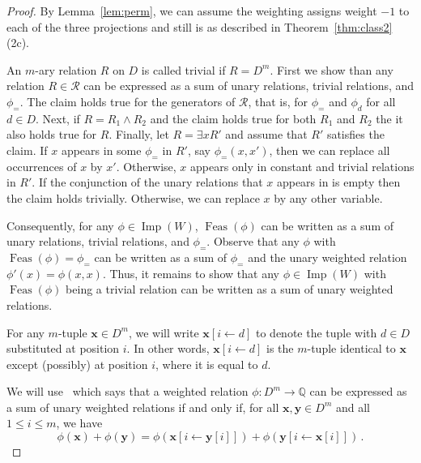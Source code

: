 \documentclass[11pt, reqno]{article}
\newcommand{\tup}[1]{\ensuremath{\mathbf #1}}
\DeclareMathOperator{\feas}{Feas}
\DeclareMathOperator{\imp}{Imp}
\newcommand{\Q}{\mbox{$\mathbb Q$}}
\theoremstyle{remark}
\begin{document}
\begin{proof}
By Lemma~\ref{lem:perm}, we can assume the weighting assigns weight $-1$ to each
of the three projections and still is as described in
Theorem~\ref{thm:class2}\,(2c).

An $m$-ary relation $R$ on $D$ is called trivial if $R=D^m$. First we show than
any relation $R\in\mathcal{R}$ can be expressed as a sum of unary relations,
trivial relations, and $\phi_=$. The claim holds true for the generators of
$\mathcal{R}$, that is, for $\phi_=$ and $\phi_d$ for all $d\in D$. Next, if
$R=R_1\wedge R_2$ and the claim holds true for both $R_1$ and $R_2$ the it also
holds true for $R$. Finally, let $R=\exists x R'$ and assume that $R'$ satisfies
the claim. If $x$ appears in some $\phi_=$ in $R'$, say $\phi_=(x,x')$, then we
can replace all occurrences of $x$ by $x'$. Otherwise, $x$ appears only in
constant and trivial relations in $R'$. If the conjunction of the unary
relations that $x$ appears in is empty then the claim holds trivially.
Otherwise, we can replace $x$ by any other variable.

Consequently, for any $\phi\in\imp(W)$, $\feas(\phi)$ can be written as a sum of
unary relations, trivial relations, and $\phi_=$. Observe that any $\phi$ with
$\feas(\phi)=\phi_=$ can be written as a sum of $\phi_=$ and the unary weighted
relation $\phi'(x)=\phi(x,x)$. Thus, it remains to show that any
$\phi\in\imp(W)$ with $\feas(\phi)$ being a trivial relation can be written as a
sum of unary weighted relations.

For any $m$-tuple $\tup{x}\in D^m$, we will write $\tup{x}[i\leftarrow d]$ to
denote the tuple with $d\in D$ {substituted} at position $i$. In other words,
$\tup{x}[i\leftarrow d]$ is the $m$-tuple identical to $\tup{x}$ except
(possibly) at position $i$, where it is equal to $d$.

We will use~\cite[Lemma~6.23]{Cohen06:complexitysoft} which says that a weighted
relation $\phi:D^m\to\Q$ can be expressed as a sum of unary weighted relations if and
only if, for all $\tup{x},\tup{y}\in D^m$ and all $1\leq i\leq m$, we have
\begin{equation}
\phi(\tup{x})+\phi(\tup{y}) = \phi(\tup{x}[i\leftarrow \tup{y}[i]]) +
\phi(\tup{y}[i\leftarrow \tup{x}[i]])\,.
\end{equation}


\end{proof}
\end{document}
